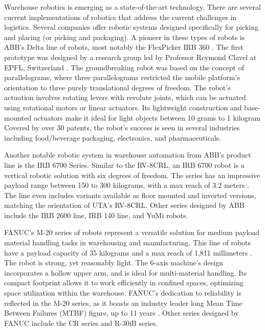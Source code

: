 Warehouse robotics is emerging as a state-of-the-art technology. There are several current implementations of robotics that address the current challenges in logistics. Several companies offer robotic systems designed specifically for picking and placing (or picking and packaging). A pioneer in these types of robots is ABB's Delta line of robots, most notably the FlexPicker IRB 360 \cite{robotsdonerightHistoryRobots}. The first prototype was designed by a research group led by Professor Reymond Clavel at EPFL, Switzerland \cite{bonev_delta_2001}. The groundbreaking robot was based on the concept of parallelograms, where three parallelograms restricted the mobile platform's orientation to three purely translational degrees of freedom. The robot's actuation involves rotating levers with revolute joints, which can be actuated using rotational motors or linear actuators. Its lightweight construction and base-mounted actuators make it ideal for light objects between 10 grams to 1 kilogram \cite{bonev_delta_2001} Covered by over 30 patents, the robot's success is seen in several industries including food/beverage packaging, electronics, and pharmaceuticals. 

Another notable robotic system in warehouse automation from ABB's product line is the IRB 6700 Series.  Similar to the RV-8CRL, an IRB 6700 robot is a vertical robotic solution with six degrees of freedom. The series has an impressive payload range between 150 to 300 kilograms, with a max reach of 3.2 meters \cite{robotics2021product}. The line even includes variants available as floor mounted and inverted versions, matching the orientation of UTA's RV-8CRL. Other series designed by ABB include the IRB 2600 line, IRB 140 line, and YuMi robots.

FANUC's M-20 series of robots represent a versatile solution for medium payload material handling tasks in warehousing and manufacturing. This line of robots have a payload capacity of 35 kilograms and a max reach of 1,811 millimeters \cite{connolly2007new}. The robot is strong, yet reasonably light. The 6-axis machine's design incorporates a hollow upper arm, and is ideal for multi-material handling. Its compact footprint allows it to work efficiently in confined spaces, optimizing space utilization within the warehouse. FANUC's dedication to reliability is reflected in the M-20 series, as it boasts an industry leader long Mean Time Between Failures (MTBF) figure, up to 11 years \cite{aggogeri2020robotic}. Other series designed by FANUC include the CR series and R-30iB series.

